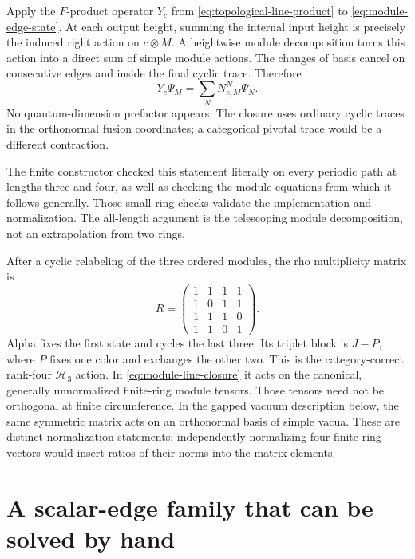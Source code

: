 Apply the $F$-product operator $Y_c$ from
\eqref{eq:topological-line-product} to \eqref{eq:module-edge-state}.
At each output height, summing the internal input height is precisely
the induced right action on $c\otimes M$. A heightwise module
decomposition turns this action into a direct sum of simple module
actions. The changes of basis cancel on consecutive edges and inside
the final cyclic trace. Therefore
\begin{equation}
 Y_c\Psi_M=\sum_NN_{c,M}^{N}\Psi_N.
 \label{eq:module-line-closure}
\end{equation}
No quantum-dimension prefactor appears. The closure uses ordinary
cyclic traces in the orthonormal fusion coordinates; a categorical
pivotal trace would be a different contraction.

The finite constructor checked this statement literally on every
periodic path at lengths three and four, as well as checking the
module equations from which it follows generally. Those small-ring
checks validate the implementation and normalization. The all-length
argument is the telescoping module decomposition, not an extrapolation
from two rings.

After a cyclic relabeling of the three ordered modules, the rho
multiplicity matrix is
\begin{equation}
 R=\begin{pmatrix}
 1&1&1&1\\
 1&0&1&1\\
 1&1&1&0\\
 1&1&0&1
 \end{pmatrix}.
 \label{eq:H3-rank4-R}
\end{equation}
Alpha fixes the first state and cycles the last three. Its triplet
block is $J-P$, where $P$ fixes one color and exchanges the other
two. This is the category-correct rank-four $\mathcal H_3$ action. In
\eqref{eq:module-line-closure} it acts on the canonical, generally
unnormalized finite-ring module tensors. Those tensors need not be
orthogonal at finite circumference. In the gapped vacuum description
below, the same symmetric matrix acts on an orthonormal basis of
simple vacua. These are distinct normalization statements; independently
normalizing four finite-ring vectors would insert ratios of their norms
into the matrix elements.

\section{A scalar-edge family that can be solved by hand}

